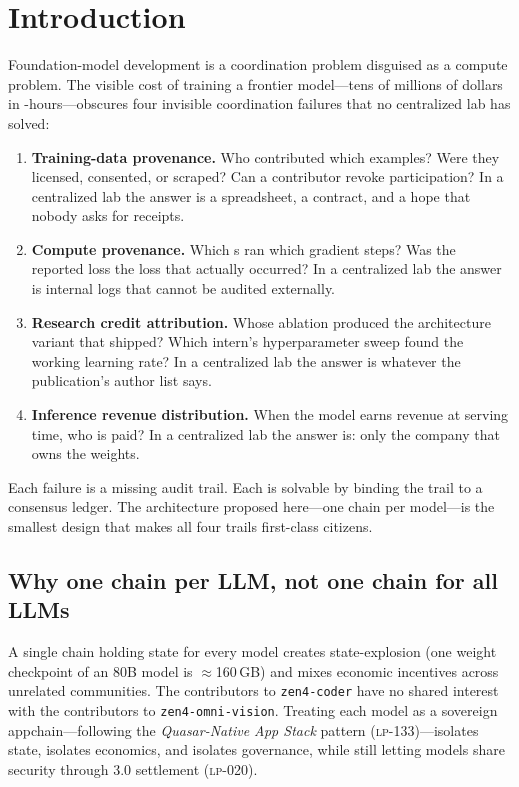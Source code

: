 \section{Introduction}
\label{sec:introduction}

Foundation-model development is a coordination problem disguised as a compute problem. The visible cost of training a frontier model---tens of millions of dollars in \GPU{}-hours---obscures four invisible coordination failures that no centralized lab has solved:

\begin{enumerate}[leftmargin=*]
\item \textbf{Training-data provenance.} Who contributed which examples? Were they licensed, consented, or scraped? Can a contributor revoke participation? In a centralized lab the answer is a spreadsheet, a contract, and a hope that nobody asks for receipts.
\item \textbf{Compute provenance.} Which \GPU{}s ran which gradient steps? Was the reported loss the loss that actually occurred? In a centralized lab the answer is internal logs that cannot be audited externally.
\item \textbf{Research credit attribution.} Whose ablation produced the architecture variant that shipped? Which intern's hyperparameter sweep found the working learning rate? In a centralized lab the answer is whatever the publication's author list says.
\item \textbf{Inference revenue distribution.} When the model earns revenue at serving time, who is paid? In a centralized lab the answer is: only the company that owns the weights.
\end{enumerate}

Each failure is a missing audit trail. Each is solvable by binding the trail to a consensus ledger. The architecture proposed here---one chain per model---is the smallest design that makes all four trails first-class citizens.

\subsection{Why one chain per LLM, not one chain for all LLMs}

A single chain holding state for every model creates state-explosion (one weight checkpoint of an 80B model is $\approx$160\,GB) and mixes economic incentives across unrelated communities. The contributors to \texttt{zen4-coder} have no shared interest with the contributors to \texttt{zen4-omni-vision}. Treating each model as a sovereign appchain---following the \emph{Quasar-Native App Stack} pattern (\textsc{lp-133})---isolates state, isolates economics, and isolates governance, while still letting models share security through \Quasar{} 3.0 settlement (\textsc{lp-020}).

